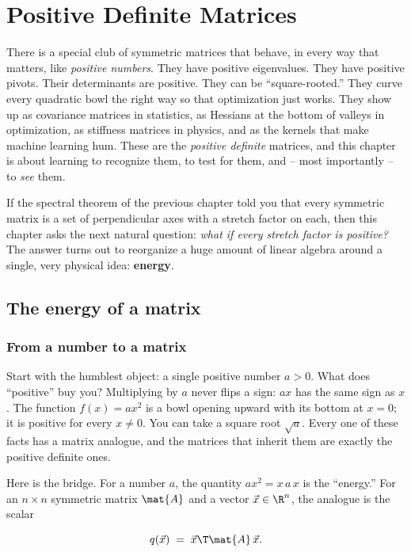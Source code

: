 \chapter{Positive Definite Matrices}

There is a special club of symmetric matrices that behave, in every way that matters, like
\emph{positive numbers}. They have positive eigenvalues. They have positive pivots. Their
determinants are positive. They can be ``square-rooted.'' They curve every quadratic bowl the
right way so that optimization just works. They show up as covariance matrices in statistics, as
Hessians at the bottom of valleys in optimization, as stiffness matrices in physics, and as the
kernels that make machine learning hum. These are the \emph{positive definite} matrices, and this
chapter is about learning to recognize them, to test for them, and -- most importantly -- to
\emph{see} them.

If the spectral theorem of the previous chapter told you that every symmetric matrix is a set of
perpendicular axes with a stretch factor on each, then this chapter asks the next natural question:
\emph{what if every stretch factor is positive?} The answer turns out to reorganize a huge amount of
linear algebra around a single, very physical idea: \textbf{energy}.

\section{The energy of a matrix}

\subsection{From a number to a matrix}

Start with the humblest object: a single positive number $a > 0$. What does ``positive'' buy you?
Multiplying by $a$ never flips a sign: $a x$ has the same sign as $x$. The function $f(x) = a x^2$
is a bowl opening upward with its bottom at $x = 0$; it is positive for every $x \neq 0$. You can
take a square root $\sqrt{a}$. Every one of these facts has a matrix analogue, and the matrices that
inherit them are exactly the positive definite ones.

Here is the bridge. For a number $a$, the quantity $a x^2 = x \, a \, x$ is the ``energy.'' For an
$n \times n$ symmetric matrix $\mat{A}$ and a vector $\vec{x} \in \R^n$, the analogue is the scalar

\[
  q(\vec{x}) \;=\; \vec{x}\T \mat{A}\, \vec{x}.
\]

